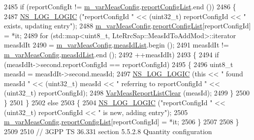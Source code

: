 \begin{DoxyCode}
2485       \textcolor{keywordflow}{if} (reportConfigIt != \hyperlink{classns3_1_1LteUeRrc_a27a7773eedfdab964d2514d9eeb1c562}{m\_varMeasConfig}.\hyperlink{structns3_1_1LteUeRrc_1_1VarMeasConfig_a3ebdd65b8ad3393b5e869599e2a0afff}{reportConfigList}.end ())
2486         \{
2487           \hyperlink{group__logging_ga88acd260151caf2db9c0fc84997f45ce}{NS\_LOG\_LOGIC} (\textcolor{stringliteral}{"reportConfigId "} << (uint32\_t) reportConfigId << \textcolor{stringliteral}{" exists, updating
       entry"});
2488           \hyperlink{classns3_1_1LteUeRrc_a27a7773eedfdab964d2514d9eeb1c562}{m\_varMeasConfig}.\hyperlink{structns3_1_1LteUeRrc_1_1VarMeasConfig_a3ebdd65b8ad3393b5e869599e2a0afff}{reportConfigList}[reportConfigId] = *it;
2489           \textcolor{keywordflow}{for} (std::map<uint8\_t, LteRrcSap::MeasIdToAddMod>::iterator measIdIt 
2490                  = \hyperlink{classns3_1_1LteUeRrc_a27a7773eedfdab964d2514d9eeb1c562}{m\_varMeasConfig}.\hyperlink{structns3_1_1LteUeRrc_1_1VarMeasConfig_aa7ad91f943892cec48ffa9a5ae872e8c}{measIdList}.begin ();
2491                measIdIt != \hyperlink{classns3_1_1LteUeRrc_a27a7773eedfdab964d2514d9eeb1c562}{m\_varMeasConfig}.\hyperlink{structns3_1_1LteUeRrc_1_1VarMeasConfig_aa7ad91f943892cec48ffa9a5ae872e8c}{measIdList}.end ();
2492                ++measIdIt)
2493             \{
2494               \textcolor{keywordflow}{if} (measIdIt->second.reportConfigId == reportConfigId)
2495                 \{
2496                   uint8\_t measId = measIdIt->second.measId;
2497                   \hyperlink{group__logging_ga88acd260151caf2db9c0fc84997f45ce}{NS\_LOG\_LOGIC} (\textcolor{keyword}{this} << \textcolor{stringliteral}{" found measId "} << (uint32\_t) measId << \textcolor{stringliteral}{" referring to
       reportConfigId "} << (uint32\_t)  reportConfigId);
2498                   \hyperlink{classns3_1_1LteUeRrc_aa1a5d20a96dec717502ccf0030921f53}{VarMeasReportListClear} (measId);
2499                 \}
2500             \}
2501         \}
2502       \textcolor{keywordflow}{else}
2503         \{
2504           \hyperlink{group__logging_ga88acd260151caf2db9c0fc84997f45ce}{NS\_LOG\_LOGIC} (\textcolor{stringliteral}{"reportConfigId "} << (uint32\_t) reportConfigId << \textcolor{stringliteral}{" is new, adding
       entry"});
2505           \hyperlink{classns3_1_1LteUeRrc_a27a7773eedfdab964d2514d9eeb1c562}{m\_varMeasConfig}.\hyperlink{structns3_1_1LteUeRrc_1_1VarMeasConfig_a3ebdd65b8ad3393b5e869599e2a0afff}{reportConfigList}[reportConfigId] = *it;
2506         \}
2507 
2508     \}
2509 
2510   \textcolor{comment}{// 3GPP TS 36.331 section 5.5.2.8 Quantity configuration}

\end{DoxyCode}
